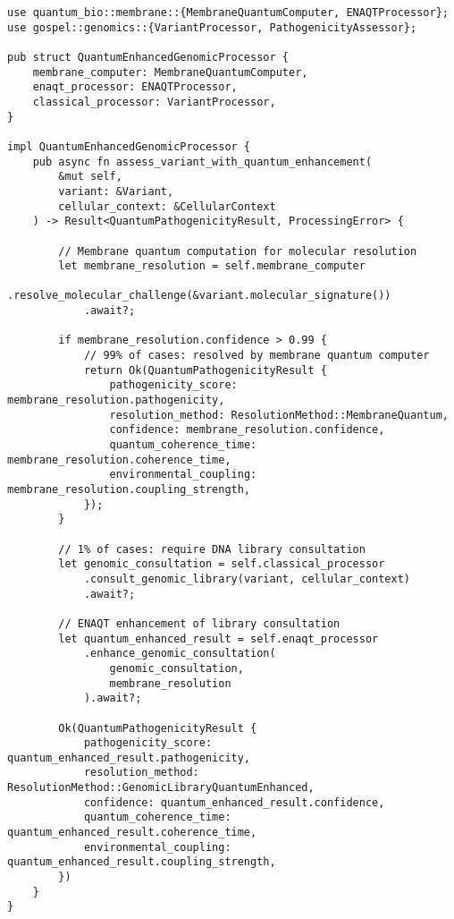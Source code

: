 \documentclass[12pt,a4paper]{article}
\begin{document}
\begin{lstlisting}[style=ruststyle, caption=Quantum-Enhanced Genomic Processing]
use quantum_bio::membrane::{MembraneQuantumComputer, ENAQTProcessor};
use gospel::genomics::{VariantProcessor, PathogenicityAssessor};

pub struct QuantumEnhancedGenomicProcessor {
    membrane_computer: MembraneQuantumComputer,
    enaqt_processor: ENAQTProcessor,
    classical_processor: VariantProcessor,
}

impl QuantumEnhancedGenomicProcessor {
    pub async fn assess_variant_with_quantum_enhancement(
        &mut self,
        variant: &Variant,
        cellular_context: &CellularContext
    ) -> Result<QuantumPathogenicityResult, ProcessingError> {
        
        // Membrane quantum computation for molecular resolution
        let membrane_resolution = self.membrane_computer
            .resolve_molecular_challenge(&variant.molecular_signature())
            .await?;
        
        if membrane_resolution.confidence > 0.99 {
            // 99% of cases: resolved by membrane quantum computer
            return Ok(QuantumPathogenicityResult {
                pathogenicity_score: membrane_resolution.pathogenicity,
                resolution_method: ResolutionMethod::MembraneQuantum,
                confidence: membrane_resolution.confidence,
                quantum_coherence_time: membrane_resolution.coherence_time,
                environmental_coupling: membrane_resolution.coupling_strength,
            });
        }
        
        // 1% of cases: require DNA library consultation
        let genomic_consultation = self.classical_processor
            .consult_genomic_library(variant, cellular_context)
            .await?;
        
        // ENAQT enhancement of library consultation
        let quantum_enhanced_result = self.enaqt_processor
            .enhance_genomic_consultation(
                genomic_consultation,
                membrane_resolution
            ).await?;
        
        Ok(QuantumPathogenicityResult {
            pathogenicity_score: quantum_enhanced_result.pathogenicity,
            resolution_method: ResolutionMethod::GenomicLibraryQuantumEnhanced,
            confidence: quantum_enhanced_result.confidence,
            quantum_coherence_time: quantum_enhanced_result.coherence_time,
            environmental_coupling: quantum_enhanced_result.coupling_strength,
        })
    }
}
\end{lstlisting}
\end{document}
